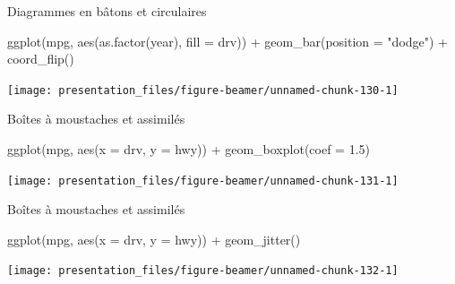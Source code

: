 \documentclass[12pt,handout,ignorenonframetext,]{beamer}
\newenvironment{Shaded}{}{}
\newcommand{\KeywordTok}[1]{\textcolor[rgb]{0.00,0.00,1.00}{#1}}
\newcommand{\DataTypeTok}[1]{#1}
\newcommand{\FloatTok}[1]{#1}
\newcommand{\StringTok}[1]{\textcolor[rgb]{0.00,0.50,0.50}{#1}}
\newcommand{\OperatorTok}[1]{#1}
\newcommand{\NormalTok}[1]{#1}
\renewenvironment{Shaded}{\begin{snugshade}}{\end{snugshade}}
\begin{document}
\begin{frame}[fragile]{Diagrammes en bâtons et circulaires}

\footnotesize \center

\begin{Shaded}
\begin{Highlighting}[]
\KeywordTok{ggplot}\NormalTok{(mpg, }\KeywordTok{aes}\NormalTok{(}\KeywordTok{as.factor}\NormalTok{(year), }\DataTypeTok{fill =}\NormalTok{ drv)) }\OperatorTok{+}\StringTok{ }
\StringTok{  }\KeywordTok{geom_bar}\NormalTok{(}\DataTypeTok{position =} \StringTok{"dodge"}\NormalTok{) }\OperatorTok{+}\StringTok{ }
\StringTok{  }\KeywordTok{coord_flip}\NormalTok{()}
\end{Highlighting}
\end{Shaded}

\texttt{[image: presentation\_files/figure-beamer/unnamed-chunk-130-1]}

\end{frame}

\begin{frame}[fragile]{Boîtes à moustaches et assimilés}

\footnotesize \center

\begin{Shaded}
\begin{Highlighting}[]
\KeywordTok{ggplot}\NormalTok{(mpg, }\KeywordTok{aes}\NormalTok{(}\DataTypeTok{x =}\NormalTok{ drv, }\DataTypeTok{y =}\NormalTok{ hwy)) }\OperatorTok{+}\StringTok{ }
\StringTok{  }\KeywordTok{geom_boxplot}\NormalTok{(}\DataTypeTok{coef =} \FloatTok{1.5}\NormalTok{)}
\end{Highlighting}
\end{Shaded}

\texttt{[image: presentation\_files/figure-beamer/unnamed-chunk-131-1]}

\end{frame}

\begin{frame}[fragile]{Boîtes à moustaches et assimilés}

\footnotesize \center

\begin{Shaded}
\begin{Highlighting}[]
\KeywordTok{ggplot}\NormalTok{(mpg, }\KeywordTok{aes}\NormalTok{(}\DataTypeTok{x =}\NormalTok{ drv, }\DataTypeTok{y =}\NormalTok{ hwy)) }\OperatorTok{+}\StringTok{ }
\StringTok{  }\KeywordTok{geom_jitter}\NormalTok{()}
\end{Highlighting}
\end{Shaded}

\texttt{[image: presentation\_files/figure-beamer/unnamed-chunk-132-1]}

\end{frame}
\end{document}
